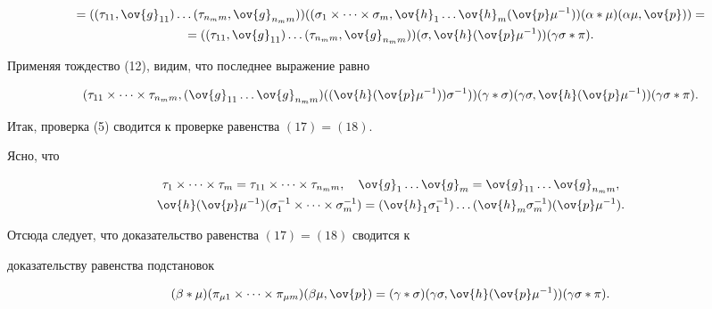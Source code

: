 \begin{pf}
\begin{multline*}
=(( \t_{11},\ov{g}_{11}) \dotsc (\t_{{n_m}m},\ov{g}_{{n_m}m}))


(( \s_1 \times \dotsb \times \s_m,\ov{h}_1 \dotsc \ov{h}_m ( \ov{p}\mu^{-1}))


( \al * \mu)( \al\mu,\ov{p}))=\\


=(( \t_{11},\ov{g}_{11}) \dotsc (\t_{{n_m}m},\ov{g}_{{n_m}m}))


(\s,\ov{h}(\ov{p}\mu^{-1}))(\g\s *\pi).


\end{multline*}








Применяя тождество (12), видим, что последнее выражение равно


\begin{equation}


( \t_{11} \times \dotsb \times \t_{n_{m}m}, ( \ov{g}_{11} \dotsc \ov{g}_{n_{m}m})


( (\ov{h}(\ov{p} \mu^{-1})) \s^{-1}))


(\g * \s)(\g\s,\ov{h}(\ov{p}\mu^{-1}))(\g\s* \pi).


\end{equation}


Итак, проверка (5) сводится к проверке равенства $(17)=(18)$.


Ясно, что


\begin{gather*}


\t_1 \times \dotsb \times \t_m=\t_{11} \times \dotsb \times \t_{n_{m}m},\quad


\ov{g}_{1} \dotsc \ov{g}_{m}=\ov{g}_{11} \dotsc \ov{g}_{n_{m}m},\\


\ov{h}(\ov{p}\mu^{-1}) (\s_1^{-1} \times \dotsb \times \s_m^{-1})=


(\ov{h}_1\s_1^{-1}) \dotsc (\ov{h}_m\s_m^{-1})(\ov{p}\mu^{-1}).


\end{gather*}


Отсюда следует, что доказательство равенства $(17)=(18)$ сводится к


доказательству равенства подстановок


\begin{equation}


(\be * \mu)(\pi_{\mu1} \times \dotsb \times \pi_{\mu{m}}) (\be \mu, \ov{p})=


(\g * \s)(\g\s,\ov{h}(\ov{p}\mu^{-1}))(\g\s* \pi).



\end{equation}
\end{pf}
